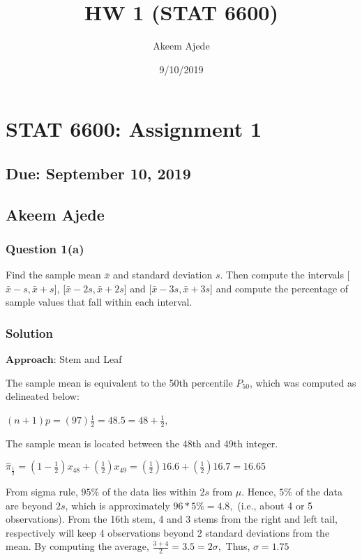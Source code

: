 \documentclass[]{article}
\title{HW 1 (STAT 6600)}
\author{Akeem Ajede}
\date{9/10/2019}
\begin{document}
\maketitle

\hypertarget{stat-6600-assignment-1}{%
\section{STAT 6600: Assignment 1}\label{stat-6600-assignment-1}}

\hypertarget{due-september-10-2019}{%
\subsection{Due: September 10, 2019}\label{due-september-10-2019}}

\hypertarget{akeem-ajede}{%
\subsection{Akeem Ajede}\label{akeem-ajede}}

\medskip

\hypertarget{question-1a}{%
\subsubsection{Question 1(a)}\label{question-1a}}

Find the sample mean \(\bar{x}\) and standard deviation \(s\). Then
compute the intervals {[}\(\bar{x}-s, \bar{x}+s\){]},
{[}\(\bar{x}-2s, \bar{x}+2s\){]} and {[}\(\bar{x}-3s, \bar{x}+3s\){]}
and compute the percentage of sample values that fall within each
interval.

\hypertarget{solution}{%
\subsubsection{Solution}\label{solution}}

\(\mathbf{Approach}\): Stem and Leaf

The sample mean is equivalent to the 50th percentile \(P_{50}\), which
was computed as delineated below:

\((n+1)p=(97)\frac{1}{2}=48.5 = 48+\frac{1}{2}\),

The sample mean is located between the 48th and 49th integer.

\(\hat{\pi}_{\frac{1}{2}}=(1-\frac{1}{2})x_{48}+(\frac{1}{2})x_{49}=(\frac{1}{2})16.6+(\frac{1}{2})16.7=16.65\)

From sigma rule, \(95\%\) of the data lies within \(2s\) from \(\mu\).
Hence, \(5\%\) of the data are beyond \(2s\), which is approximately
\(96*5\%=4.8,\) (i.e., about 4 or 5 observations). From the 16th stem, 4
and 3 stems from the right and left tail, respectively will keep 4
observations beyond 2 standard deviations from the mean. By computing
the average, \(\frac{3+4}{2}=3.5=2\sigma,\) Thus, \(\sigma=1.75\)
\end{document}
